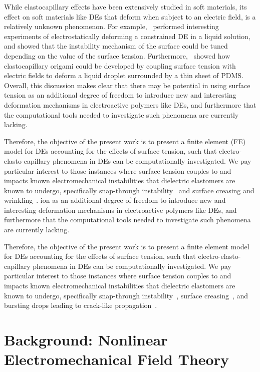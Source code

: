 \documentclass[final,authoryear,3p,times,twocolumn]{elsarticle}
\begin{document}
While elastocapillary effects have been extensively studied in soft materials, its effect on soft materials like DEs that deform when subject to an electric field, is a relatively unknown phenomenon.  For example,~\citet{wangPRE2013} performed interesting experiments of electrostatically deforming a constrained DE in a liquid solution, and showed that the instability mechanism of the surface could be tuned depending on the value of the surface tension.  Furthermore,~\citet{pineiruaSM2010} showed how elastocapillary origami could be developed by coupling surface tension with electric fields to deform a liquid droplet surrounded by a thin sheet of PDMS.  Overall, this discussion makes clear that there may be potential in using surface tension as an additional degree of freedom to introduce new and interesting deformation mechanisms in electroactive polymers like DEs, and furthermore that the computational tools needed to investigate such phenomena are currently lacking.  

Therefore, the objective of the present work is to present a finite element (FE) model for DEs accounting for the effects of surface tension, such that electro-elasto-capillary phenomena in DEs can be computationally investigated.  We pay particular interest to those instances where surface tension couples to and impacts known electromechanical instabilities that dielectric elastomers are known to undergo, specifically snap-through instability~\citep{pelrineSCIENCE2000} and surface creasing and wrinkling~\citep{wangPRL2011,wangAM2012,wangPRE2013}.
ion as an additional degree of freedom to introduce new and interesting deformation mechanisms in electroactive polymers like DEs, and furthermore that the computational tools needed to investigate such phenomena are currently lacking.  

Therefore, the objective of the present work is to present a finite element model for DEs accounting for the effects of surface tension, such that electro-elasto-capillary phenomena in DEs can be computationally investigated.  We pay particular interest to those instances where surface tension couples to and impacts known electromechanical instabilities that dielectric elastomers are known to undergo, specifically snap-through instability~\citep{pelrineSCIENCE2000}, surface creasing~\citep{wangPRL2011,wangAM2012}, and bursting drops leading to crack-like propagation~\citep{wangNC2012}.

\section{Background: Nonlinear Electromechanical Field Theory}
\end{document}

